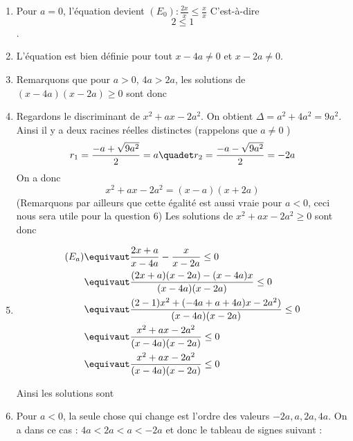 \begin{correction}
\begin{enumerate}
\item Pour $a=0$, l'équation devient $(E_0)  : \frac{2x}{x} \leq \frac{x}{x}$ 
C'est-à-dire $$2\leq 1$$. 
\item L'équation est bien définie pour tout $x-4a \neq 0$ et $x -2a\neq 0$. 
\item Remarquons que pour $a>0$, $4a>2a$, les solutions de $(x-4a)(x-2a)\geq0$ sont donc 
\conclusion{ $S_1 = ]-\infty , 2a[ \cup ]4a, +\infty[$}
\item Regardons le discriminant de $x^2 +ax-2a^2 $. On obtient 
$\Delta = a^2 +4a^2 = 9a^2$.
Ainsi il y a deux racines réelles distinctes (rappelons que $a\neq 0$ ) 
$$r_1 = \frac{-a +\sqrt{9a^2}}{2} = a \quadet r_2  = \frac{-a -\sqrt{9a^2}}{2} = -2a$$
On  a donc $$x^2 +ax-2a^2  = (x-a)(x+2a)$$
(Remarquons par ailleurs que cette égalité est aussi vraie pour $a<0$, ceci nous sera utile pour la question 6) 
Les solutions  de $x^2 +ax-2a^2 \geq 0 $ sont donc 
\conclusion{ $] -\infty, -2a[\cup ]a, +\infty[$}
\item 
\begin{align*}
(E_a) \equivaut & \frac{2x+a}{x-4a} -\frac{x}{x-2a} \leq 0\\
		\equivaut & \frac{(2x+a)(x-2a) -(x-4a)x}{(x-4a)(x-2a)}\leq 0\\		
		\equivaut & \frac{(2-1)x^2+(-4a+a+4a)x -2a^2)}{(x-4a)(x-2a)}\leq 0\\		
		\equivaut & \frac{x^2+ax -2a^2}{(x-4a)(x-2a)}\leq 0	\\			
		\equivaut & \frac{x^2+ax -2a^2}{(x-4a)(x-2a)}\leq 0	
\end{align*}
  
 Ainsi les solutions sont 
 \conclusion{ $S_a =[-2a,a] \cup ]2a,4a[$}
 
 \item Pour $a<0$, la seule chose qui change est l'ordre des  valeurs $-2a,a,2a,4a$. On a dans ce cas : $4a<2a <a<-2a$ et donc le tableau de signes suivant : 
 

\end{enumerate}
\end{correction}
